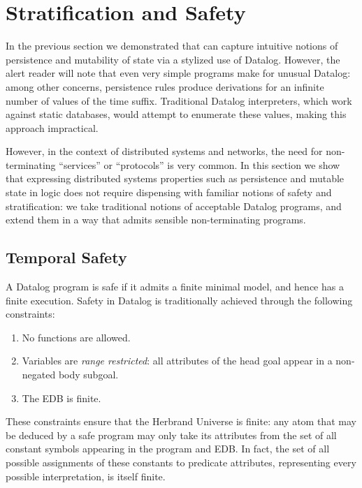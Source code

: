 \section{Stratification and Safety}
\label{sec:safety}
In the previous section we demonstrated that \slang can capture
intuitive notions of persistence and mutability of state via a
stylized use of Datalog.  However, the alert reader will note that
even very simple \slang programs make for unusual Datalog: among other
concerns, persistence rules produce derivations for an infinite number
of values of the time suffix.  Traditional Datalog interpreters, which
work against static databases, would attempt to enumerate these
values, making this approach impractical.

However, in the context of distributed systems and networks, the need
for non-terminating ``services'' or ``protocols'' is very common.  In
this section we show that expressing distributed systems properties
such as persistence and mutable state in logic does not require
dispensing with familiar notions of safety and stratification: we take
traditional notions of acceptable Datalog programs, and extend them in
a way that admits sensible non-terminating programs.



\subsection{Temporal Safety}
A Datalog program is safe if it admits a finite minimal model, and hence has
a finite execution.  Safety in Datalog is traditionally achieved
through the following constraints:

\begin{enumerate}
%
\item No functions are allowed.
%
\item Variables are \emph{range restricted}: all attributes of the head goal
appear in a non-negated body subgoal.
%
\item The EDB is finite.
%
\end{enumerate}

These constraints ensure that the Herbrand Universe is finite: any atom that
may be deduced by a safe program may only take its attributes from the 
set of all constant symbols appearing in the program and EDB.
In fact, the set of all possible assignments of these constants to predicate
attributes, representing every possible interpretation, is itself finite. 

